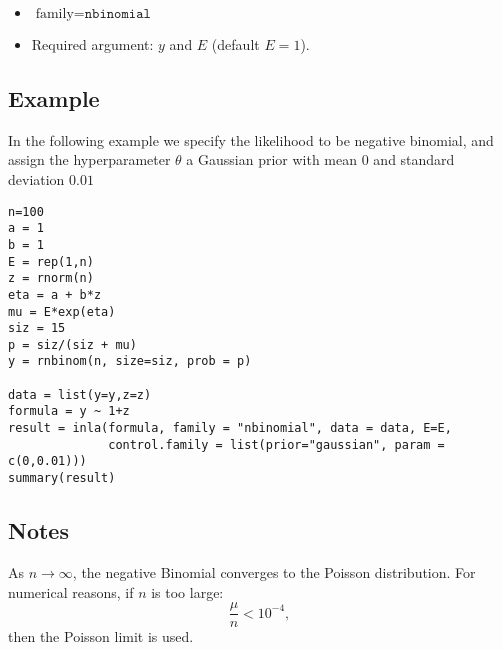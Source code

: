 \documentclass[a4paper,11pt]{article}
\begin{document}
\begin{itemize}
\item $\text{family}=\texttt{nbinomial}$
\item Required argument: $y$ and $E$ (default $E=1$).
\end{itemize}

\subsection*{Example}
In the following example we specify the likelihood to be negative binomial, and assign the hyperparameter $\theta$ a Gaussian prior with mean $0$ and standard deviation $0.01$
 
\begin{verbatim}
n=100
a = 1
b = 1
E = rep(1,n)
z = rnorm(n)
eta = a + b*z
mu = E*exp(eta)
siz = 15
p = siz/(siz + mu)
y = rnbinom(n, size=siz, prob = p)

data = list(y=y,z=z)
formula = y ~ 1+z
result = inla(formula, family = "nbinomial", data = data, E=E,
              control.family = list(prior="gaussian", param = c(0,0.01)))
summary(result)
\end{verbatim}

\subsection*{Notes}

As $n\rightarrow\infty$, the negative Binomial converges to the
Poisson distribution. For numerical reasons, if $n$ is too large:
\begin{displaymath}
    \frac{\mu}{n} < 10^{-4},
\end{displaymath}
then the Poisson limit is used.
\end{document}
